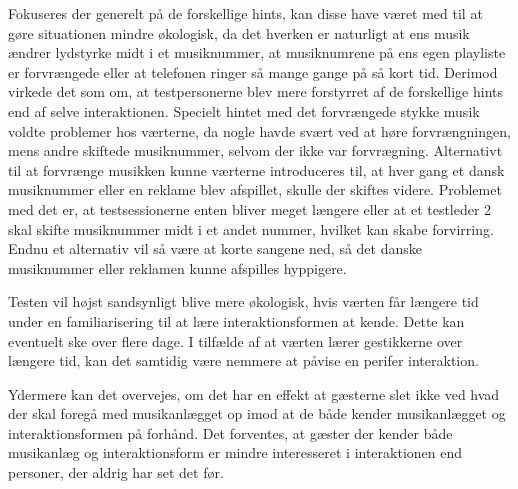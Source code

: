 Fokuseres der generelt på de forskellige hints, kan disse have været med til at gøre situationen mindre økologisk, da det hverken er naturligt at ens musik ændrer lydstyrke midt i et musiknummer, at musiknumrene på ens egen playliste er forvrængede eller at telefonen ringer så mange gange på så kort tid. Derimod virkede det som om, at testpersonerne blev mere forstyrret af de forskellige hints end af selve interaktionen. Specielt hintet med det forvrængede stykke musik voldte problemer hos værterne, da nogle havde svært ved at høre forvrængningen, mens andre skiftede musiknummer, selvom der ikke var forvrægning. Alternativt til at forvrænge musikken kunne værterne introduceres til, at hver gang et dansk musiknummer eller en reklame blev afspillet, skulle der skiftes videre. Problemet med det er, at testsessionerne enten bliver meget længere eller at et testleder 2 skal skifte musiknummer midt i et andet nummer, hvilket kan skabe forvirring. Endnu et alternativ vil så være at korte sangene ned, så det danske musiknummer eller reklamen kunne afspilles hyppigere. 

Testen vil højst sandsynligt blive mere økologisk, hvis værten får længere tid under en familiarisering til at lære interaktionsformen at kende. Dette kan eventuelt ske over flere dage. I tilfælde af at værten lærer gestikkerne over længere tid, kan det samtidig være nemmere at påvise en perifer interaktion.

 Ydermere kan det overvejes, om det har en effekt at gæsterne slet ikke ved hvad der skal foregå med musikanlægget op imod at de både kender musikanlægget og interaktionsformen på forhånd. Det forventes, at gæster der kender både musikanlæg og interaktionsform er mindre interesseret i interaktionen end personer, der aldrig har set det før. \blankline
 